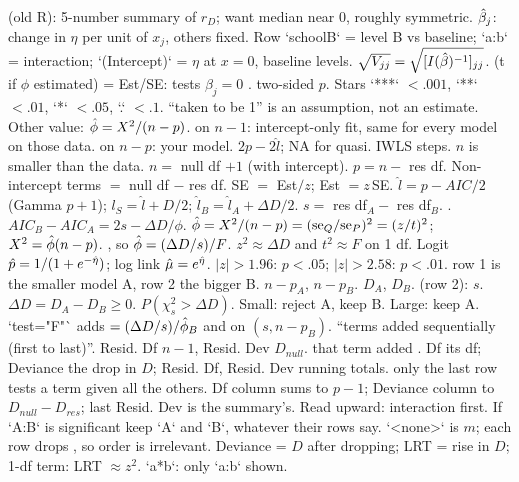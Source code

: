 \li{} (old R): 5-number summary of $r_D$; want median near 0, roughly symmetric.
\li{} $\hat{\beta}_j$: change in $\eta$ per unit of $x_j$, others fixed. Row `schoolB` = level B vs baseline; `a:b` = interaction; `(Intercept)` = $\eta$ at $x=0$, baseline levels.  $\sqrt{V_{jj}}=\sqrt{[I(\hat{\beta})^{-1}]_{jj}}$.
\li{} (t if $\phi$ estimated) = Est/SE: tests $\beta_j=0$ .  two-sided $p$. Stars `***` $<.001$, `**` $<.01$, `*` $<.05$, `.` $<.1$.
\li{} “taken to be 1” is an assumption, not an estimate. Other value: $\hat{\phi}=X^2/(n-p)$.
\li{} on $n-1$: intercept-only fit, same for every model on those data.  on $n-p$: your model.
\li{} $2p-2\hat l$; NA for quasi.  IWLS steps.  $n$ is smaller than the data.
\bx
{} $n=$ null df $+1$ (with intercept). $p=n-$ res df. Non-intercept terms $=$ null df $-$ res df. SE $=$ Est$/z$; Est $=z\,$SE. $\hat l=p-AIC/2$ (Gamma $p+1$); $l_S=\hat l+D/2$; $\hat l_B=\hat l_A+\Delta D/2$. $s=$ res df$_A-$ res df$_B$. . $AIC_B-AIC_A=2s-\Delta D/\phi$. $\hat{\phi}=X^2/(n-p)=(\mathrm{se}_Q/\mathrm{se}_P)^2=(z/t)^2$; $X^2=\hat{\phi}(n-p)$. , so $\hat{\phi}=(\Delta D/s)/F$. $z^2\approx\Delta D$ and $t^2\approx F$ on 1 df. Logit $\hat p=1/(1+e^{-\hat{\eta}})$; log link $\hat{\mu}=e^{\hat{\eta}}$. $|z|>1.96$: $p<.05$; $|z|>2.58$: $p<.01$.
\bx
{} row 1 is the smaller model A, row 2 the bigger B.
\li{} $n-p_A$, $n-p_B$.  $D_A$, $D_B$.
\li{} (row 2): $s$.  $\Delta D=D_A-D_B\ge0$.
\li{} $P(\chi^2_s>\Delta D)$. Small: reject A, keep B. Large: keep A.
\li`test="F"` adds  $=(\Delta D/s)/\hat{\phi}_B$ and  on $(s,n-p_B)$.
\sk{} “terms added sequentially (first to last)”.
\li{} Resid. Df $n-1$, Resid. Dev $D_{null}$.
\li{} that term added . Df its df; Deviance the drop in $D$; Resid. Df, Resid. Dev running totals.
\li{} only the last row tests a term given all the others.
\li{} Df column sums to $p-1$; Deviance column to $D_{null}-D_{res}$; last Resid. Dev is the summary's.
\li Read upward: interaction first. If `A:B` is significant keep `A` and `B`, whatever their rows say.
\sk{} `<none>` is $m$; each row drops , so order is irrelevant. Deviance = $D$ after dropping; LRT = rise in $D$; 1-df term: LRT $\approx z^2$. `a*b`: only `a:b` shown.
